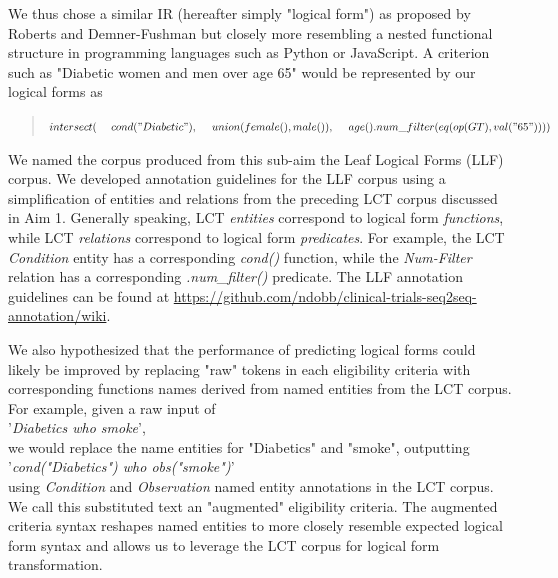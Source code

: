 \documentclass[../main.tex]{subfiles}
\begin{document}
We thus chose a similar IR (hereafter simply "logical form") as proposed by Roberts and Demner-Fushman but closely more resembling a nested functional structure in programming languages such as Python or JavaScript. A criterion such as "Diabetic women and men over age 65" would be represented by our logical forms as

\begin{quote}
$intersect( \\
    \mathrm{\ \ \ \ }cond("Diabetic"), \\
    \mathrm{\ \ \ \ }union(female(), male()),\\
    \mathrm{\ \ \ \ }age().num\_filter(eq(op(GT), val("65"))) \\
)$
\end{quote}

We named the corpus produced from this sub-aim the Leaf Logical Forms (LLF) corpus. We developed annotation guidelines for the LLF corpus using a simplification of entities and relations from the preceding LCT corpus discussed in Aim 1. Generally speaking, LCT \textit{entities} correspond to logical form \textit{functions}, while LCT \textit{relations} correspond to logical form \textit{predicates}. For example, the LCT \textit{Condition} entity has a corresponding \textit{cond()} function, while the \textit{Num-Filter} relation has a corresponding \textit{.num\_filter()} predicate. The LLF annotation guidelines can be found at \url{https://github.com/ndobb/clinical-trials-seq2seq-annotation/wiki}.

We also hypothesized that the performance of predicting logical forms could likely be improved by replacing "raw" tokens in each eligibility criteria with corresponding functions names derived from named entities from the LCT corpus. For example, given a raw input of \\

'\textit{Diabetics who smoke}', \\

\noindent we would replace the name entities for "Diabetics" and "smoke", outputting \\ 

'\textit{cond("Diabetics") who obs("smoke")}' \\

\noindent using \textit{Condition} and \textit{Observation} named entity annotations in the LCT corpus. We call this substituted text an "augmented" eligibility criteria. The augmented criteria syntax reshapes named entities to more closely resemble expected logical form syntax and allows us to leverage the LCT corpus for logical form transformation.
\end{document}
